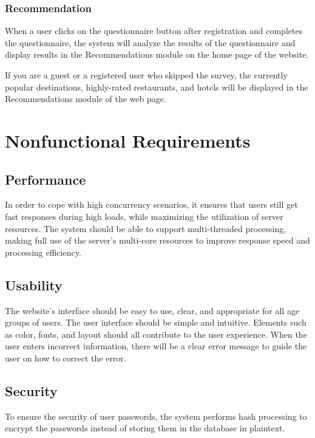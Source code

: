 \documentclass[conference]{IEEEtran}
\begin{document}
\subsubsection{ Recommendation }

When a user clicks on the questionnaire button after registration and 
completes the questionnaire, the system will analyze the results of the 
questionnaire and display results in the Recommendations module on the 
home page of the website.

If you are a guest or a registered user who skipped the survey, the 
currently popular destinations, highly-rated restaurants, and hotels will be 
displayed in the Recommendations module of the web page.


\section{Nonfunctional Requirements}

\subsection{ Performance }

In order to cope with high concurrency scenarios, it ensures that users still 
get fast responses during high loads, while maximizing the utilization of server 
resources. The system should be able to support multi-threaded processing, 
making full use of the server's multi-core resources to improve response speed 
and processing efficiency.

\subsection{ Usability }

The website's interface should be easy to use, clear, and appropriate for all 
age groups of users. The user interface should be simple and intuitive. Elements 
such as color, fonts, and layout should all contribute to the user experience.
When the user enters incorrect information, there will be a clear error message 
to guide the user on how to correct the error.

\subsection{ Security }

To ensure the security of user passwords, the system performs hash 
processing to encrypt the passwords instead of storing them in the database in 
plaintext.
\end{document}
